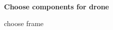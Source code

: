 \documentclass{article}
\begin{document}
 	\begin{center}
 	{
 		\huge \textbf{ Choose components for drone}
 	}
 	\end{center}
 	choose frame
 	
 	
\end{document}
